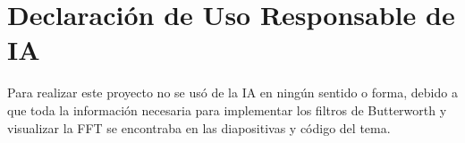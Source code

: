 \section{Declaración de Uso Responsable de IA}
    Para realizar este proyecto no se usó de la IA en ningún sentido 
    o forma, debido a que toda la información necesaria para implementar 
    los filtros de Butterworth y visualizar la FFT se encontraba en las 
    diapositivas y código del tema.